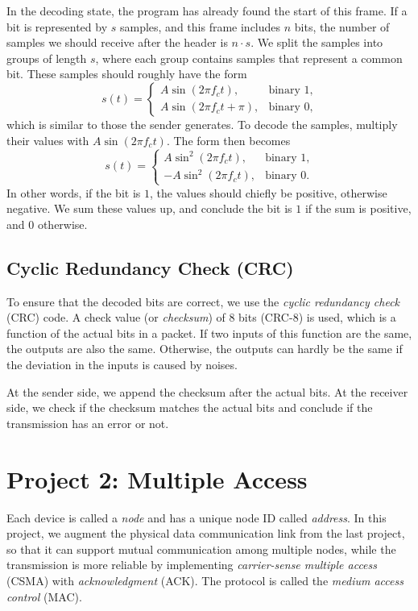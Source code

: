 \documentclass[11pt, conference]{IEEEtran}
\begin{document}
In the decoding state, the program has already found the start of this frame. If a bit is represented by $s$ samples, and this frame includes $n$ bits, the number of samples we should receive after the header is $n \cdot s$. We split the samples into groups of length $s$, where each group contains samples that represent a common bit. These samples should roughly have the form
\[
s(t) =
\begin{cases}
A\sin(2\pi f_ct), & \text{binary 1}, \\
A\sin(2\pi f_ct + \pi), & \text{binary 0},
\end{cases}
\]
which is similar to those the sender generates. To decode the samples, multiply their values with $A\sin(2\pi f_ct)$. The form then becomes
\[
s(t) =
\begin{cases}
A\sin^2(2\pi f_ct), & \text{binary 1}, \\
-A\sin^2(2\pi f_ct), & \text{binary 0}.
\end{cases}
\]
In other words, if the bit is $1$, the values should chiefly be positive, otherwise negative. We sum these values up, and conclude the bit is $1$ if the sum is positive, and $0$ otherwise.

\subsection{Cyclic Redundancy Check (CRC)}

To ensure that the decoded bits are correct, we use the \emph{cyclic redundancy check} (CRC) code. A check value (or \emph{checksum}) of 8 bits (CRC-8) is used, which is a function of the actual bits in a packet. If two inputs of this function are the same, the outputs are also the same. Otherwise, the outputs can hardly be the same if the deviation in the inputs is caused by noises.

At the sender side, we append the checksum after the actual bits. At the receiver side, we check if the checksum matches the actual bits and conclude if the transmission has an error or not.

\section{Project 2: Multiple Access}

Each device is called a \emph{node} and has a unique node ID called \emph{address}. In this project, we augment the physical data communication link from the last project, so that it can support mutual communication among multiple nodes, while the transmission is more reliable by implementing \emph{carrier-sense multiple access} (CSMA) with \emph{acknowledgment} (ACK). The protocol is called the \emph{medium access control} (MAC).
\end{document}
